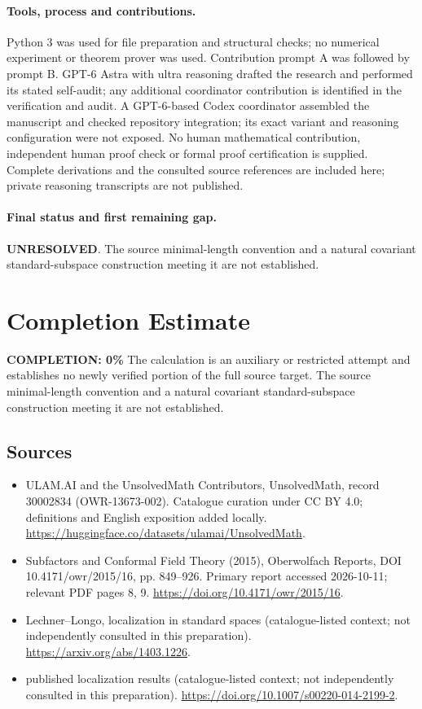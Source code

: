 \documentclass[11pt]{article}
\begin{document}
\paragraph{Tools, process and contributions.}
Python 3 was used for file preparation and structural checks; no numerical experiment or theorem prover was used. Contribution prompt A was followed by prompt B. GPT-6 Astra with ultra reasoning drafted the research and performed its stated self-audit; any additional coordinator contribution is identified in the verification and audit. A GPT-6-based Codex coordinator assembled the manuscript and checked repository integration; its exact variant and reasoning configuration were not exposed. No human mathematical contribution, independent human proof check or formal proof certification is supplied. Complete derivations and the consulted source references are included here; private reasoning transcripts are not published.

\paragraph{Final status and first remaining gap.}
\textbf{UNRESOLVED}. The source minimal-length convention and a natural covariant standard-subspace construction meeting it are not established.

\section{Completion Estimate}
\noindent\textbf{COMPLETION: 0\%}
The calculation is an auxiliary or restricted attempt and establishes no newly verified portion of the full source target. The source minimal-length convention and a natural covariant standard-subspace construction meeting it are not established.

\subsection{Sources}
\begin{itemize}
\item[\hypertarget{source:30002834:1}{S1}] ULAM.AI and the UnsolvedMath Contributors, UnsolvedMath, record 30002834 (OWR-13673-002). Catalogue curation under CC BY 4.0; definitions and English exposition added locally.
\url{https://huggingface.co/datasets/ulamai/UnsolvedMath}.
\item[\hypertarget{source:30002834:2}{S2}] Subfactors and Conformal Field Theory (2015), Oberwolfach Reports, DOI 10.4171/owr/2015/16, pp. 849--926. Primary report accessed 2026-10-11; relevant PDF pages 8, 9.
\url{https://doi.org/10.4171/owr/2015/16}.
\item[\hypertarget{source:30002834:3}{S3}] Lechner--Longo, localization in standard spaces (catalogue-listed context; not independently consulted in this preparation).
\url{https://arxiv.org/abs/1403.1226}.
\item[\hypertarget{source:30002834:4}{S4}] published localization results (catalogue-listed context; not independently consulted in this preparation).
\url{https://doi.org/10.1007/s00220-014-2199-2}.
\end{itemize}
\label{end:30002834}
\end{document}
